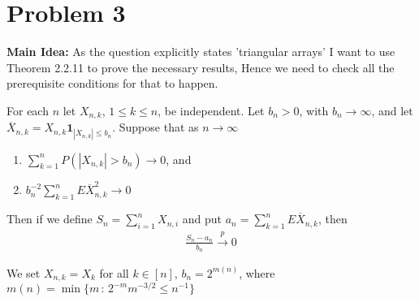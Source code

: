 \documentclass{article}
\begin{document}
\section{Problem 3}
\textbf{Main Idea:} As the question explicitly states 'triangular arrays' I want to use Theorem 2.2.11 \cite{10.5555/1869916} to prove the necessary results, Hence we need to check all the prerequisite conditions for that to happen. 
\begin{tcolorbox}[title = Theorem 2.2.11 - Weak Law for Triangular Arrays, ]
    For each $n$ let $X_{n, k}$, $1 \leq k \leq n$, be independent. Let $b_n > 0$, with $b_n \rightarrow \infty$, and let $\overline{X}_{n, k} = X_{n, k}\mathbf{1}_{|X_{n, k}|\leq b_n}$. Suppose that as $n \rightarrow \infty$
    \begin{enumerate}
        \item $\sum_{k=1}^{n} P(|X_{n, k}| > b_n) \rightarrow 0$, and 
        \item $b_n^{-2} \sum_{k=1}^{n} E\overline{X}_{n, k}^2 \rightarrow 0$
    \end{enumerate}
    Then if we define $S_n = \sum_{i=1}^{n} X_{n, i}$ and put $a_n = \sum_{k=1}^{n} E\overline{X}_{n, k}$, then 
    \begin{align*}
        \frac{S_n-a_n}{b_n} \xrightarrow{p} 0
    \end{align*}
\end{tcolorbox}
\noindent We set $X_{n, k} = X_k$ for all $k \in [n]$, $b_n = 2^{m(n)}$, where $m(n) = \min\{m \, :\, 2^{-m} m^{-3/2} \leq  n^{-1}\}$
\end{document}
